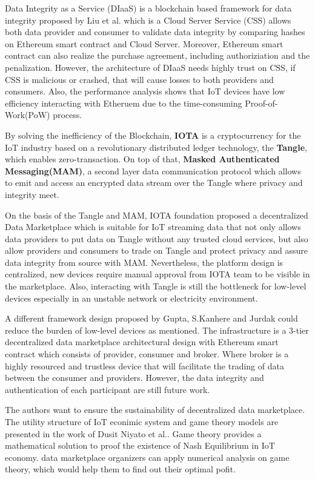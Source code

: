 \documentclass[journal,a4paper]{IEEEtran}
\begin{document}
Data Integrity as a Service (DIaaS) is a blockchain based framework for data integrity proposed by Liu et al.\cite{DIaas} which is a Cloud Server Service (CSS) allows both data provider and consumer to validate data integrity by comparing hashes on Ethereum smart contract and Cloud Server. Moreover, Ethereum smart contract can also realize the purchase agreement, including authoriziation and the penalization. However, the architecture of DIaaS needs highly trust on CSS, if CSS is malicious or crashed, that will cause losses to both providers and consumers. Also, the performance analysis shows that IoT devices have low efficiency interacting with Etheruem due to the time-consuming Proof-of-Work(PoW) process.

By solving the inefficiency of the Blockchain, \textbf{IOTA}\cite{IOTAwhitepaper} is a cryptocurrency for the IoT industry based on a revolutionary distributed ledger technology, the \textbf{Tangle}, which enables zero-transaction. On top of that, \textbf{Masked Authenticated Messaging(MAM)}\cite{MAM}, a second layer data communication protocol which allows to emit and access an encrypted data stream over the Tangle where privacy and integrity meet. 

On the basis of the Tangle and MAM, IOTA foundation proposed a decentralized Data Marketplace\cite{IOTADataMarket} which is suitable for IoT streaming data that not only allows data providers to put data on Tangle without any trusted cloud services, but also allow providers and consumers to trade on Tangle and protect privacy and assure data integrity from source with MAM. Nevertheless, the platform design is centralized, new devices require manual approval from IOTA team to be visible in the marketplace. Also, interacting with Tangle is still the bottleneck for low-level devices especially in an unstable network or electricity environment.

A different framework design proposed by Gupta, S.Kanhere and Jurdak\cite{3tierDataMarket} could reduce the burden of low-level devices as mentioned. The infrastructure is a 3-tier decentralized data marketplace architectural design with Ethereum smart contract which consists of provider, consumer and broker. Where broker is a highly resourced and trustless device that will facilitate the trading of data between the consumer and providers. However, the data integrity and authentication of each participant are still future work.  

The authors want to ensure the sustainability of decentralized data marketplace. The utility structure of IoT econimic system and game theory models are presented in the work of Dusit Niyato et al.\cite{UtilityStruct}. Game theory provides a mathematical solution to proof the existence of Nash Equilibrium in IoT economy. data marketplace organizers can apply numerical analysis on game theory, which would help them to find out their optimal pofit.
\end{document}
